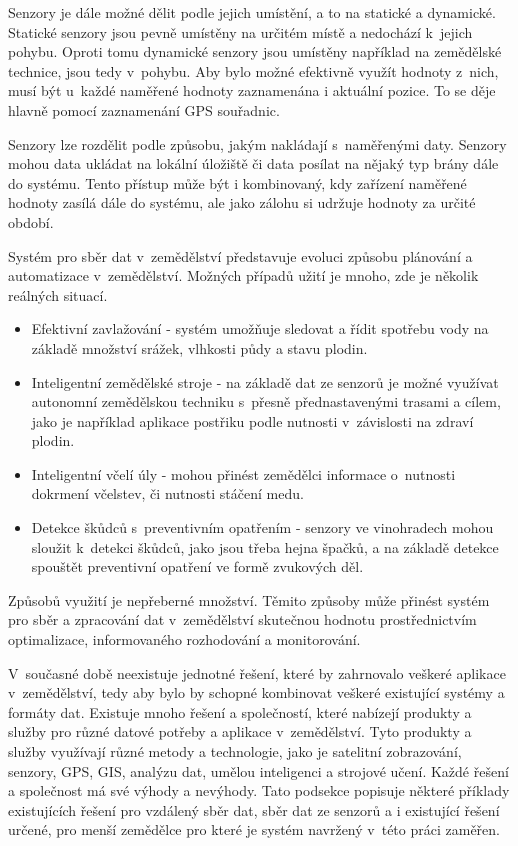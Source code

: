 Senzory je dále možné dělit podle jejich umístění, a to na statické a dynamické. Statické senzory jsou pevně umístěny na určitém místě a nedochází k~jejich pohybu. Oproti tomu dynamické senzory jsou umístěny například na zemědělské technice, jsou tedy v~pohybu. Aby bylo možné efektivně využít hodnoty z~nich, musí být u~každé naměřené hodnoty zaznamenána i aktuální pozice. To se děje hlavně pomocí zaznamenání GPS souřadnic.

Senzory lze rozdělit podle způsobu, jakým nakládají s~naměřenými daty. Senzory mohou data ukládat na lokální úložiště či data posílat na nějaký typ brány dále do systému. Tento přístup může být i kombinovaný, kdy zařízení naměřené hodnoty zasílá dále do systému, ale jako zálohu si udržuje hodnoty za určité období.

Systém pro sběr dat v~zemědělství představuje evoluci způsobu plánování a automatizace v~zemědělství. Možných případů užití je mnoho, zde je několik reálných situací.

\begin{itemize}
    \item Efektivní zavlažování - systém umožňuje sledovat a řídit spotřebu vody na základě množství srážek, vlhkosti půdy a stavu plodin.
    \item Inteligentní zemědělské stroje - na základě dat ze senzorů je možné využívat autonomní zemědělskou techniku s~přesně přednastavenými trasami a cílem, jako je například aplikace postřiku podle nutnosti v~závislosti na zdraví plodin.
    \item Inteligentní včelí úly - mohou přinést zemědělci informace o~nutnosti dokrmení včelstev, či nutnosti stáčení medu. 
    \item Detekce škůdců s~preventivním opatřením - senzory ve vinohradech mohou sloužit k~detekci škůdců, jako jsou třeba hejna špačků, a na základě detekce spouštět preventivní opatření ve formě zvukových děl.  
\end{itemize}
Způsobů využití je nepřeberné množství. Těmito způsoby může přinést systém pro sběr a zpracování dat v~zemědělství skutečnou hodnotu prostřednictvím optimalizace, informovaného rozhodování a monitorování. \cite{IOT_AGG}


\label{1_2_existing_solutions}
V~současné době neexistuje jednotné řešení, které by zahrnovalo veškeré aplikace v~zemědělství, tedy aby bylo by schopné kombinovat veškeré existující systémy a formáty dat. Existuje mnoho řešení a společností, které nabízejí produkty a služby pro různé datové potřeby a aplikace v~zemědělství. Tyto produkty a služby využívají různé metody a technologie, jako je satelitní zobrazování, senzory, GPS, GIS, analýzu dat, umělou inteligenci a strojové učení. Každé řešení a společnost má své výhody a nevýhody. Tato podsekce popisuje některé příklady existujících řešení pro vzdálený sběr dat, sběr dat ze senzorů a i existující řešení určené, pro menší zemědělce pro které je systém navržený v~této práci zaměřen.

